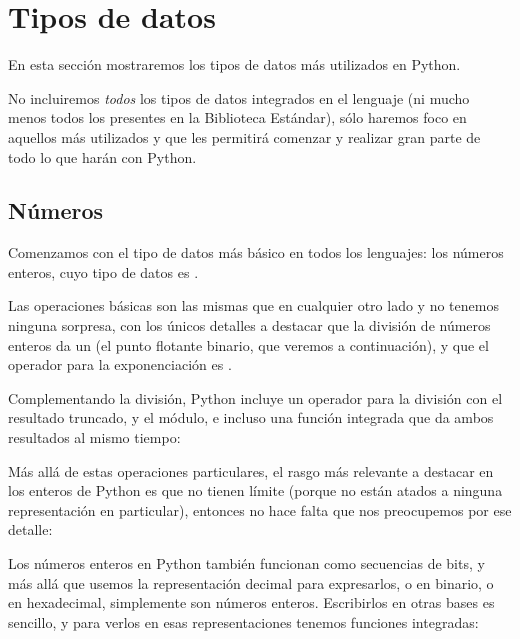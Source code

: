 \section{Tipos de datos}

En esta sección mostraremos los tipos de datos más utilizados en Python.

No incluiremos \textit{todos} los tipos de datos integrados en el lenguaje (ni mucho menos todos los presentes en la Biblioteca Estándar), sólo haremos foco en aquellos más utilizados y que les permitirá comenzar y realizar gran parte de todo lo que harán con Python.

\subsection{Números}\label{sub:numeros}

Comenzamos con el tipo de datos más básico en todos los lenguajes: los números enteros, cuyo tipo de datos es .

Las operaciones básicas son las mismas que en cualquier otro lado y no tenemos ninguna sorpresa, con los únicos detalles a destacar que la división de números enteros da un  (el punto flotante binario, que veremos a continuación), y que el operador para la exponenciación es \mip{**}.


Complementando la división, Python incluye un operador para la división con el resultado truncado, y el módulo, e incluso una función integrada que da ambos resultados al mismo tiempo:


Más allá de estas operaciones particulares, el rasgo más relevante a destacar en los enteros de Python es que no tienen límite (porque no están atados a ninguna representación en particular), entonces no hace falta que nos preocupemos por ese detalle:


Los números enteros en Python también funcionan como secuencias de bits, y más allá que usemos la representación decimal para expresarlos, o en binario, o en hexadecimal, simplemente son números enteros. Escribirlos en otras bases es sencillo, y para verlos en esas representaciones tenemos funciones integradas:


